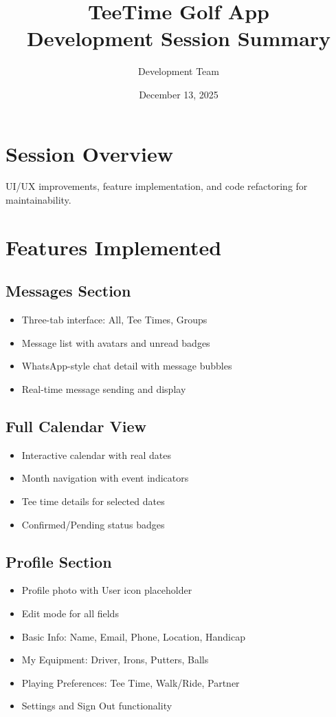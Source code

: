 \documentclass[11pt,a4paper]{article}
\title{\textbf{TeeTime Golf App}\\Development Session Summary}
\author{Development Team}
\date{December 13, 2025}
\begin{document}
\maketitle

\section{Session Overview}
UI/UX improvements, feature implementation, and code refactoring for maintainability.

\section{Features Implemented}

\subsection{Messages Section}
\begin{itemize}[noitemsep]
    \item Three-tab interface: All, Tee Times, Groups
    \item Message list with avatars and unread badges
    \item WhatsApp-style chat detail with message bubbles
    \item Real-time message sending and display
\end{itemize}

\subsection{Full Calendar View}
\begin{itemize}[noitemsep]
    \item Interactive calendar with real dates
    \item Month navigation with event indicators
    \item Tee time details for selected dates
    \item Confirmed/Pending status badges
\end{itemize}

\subsection{Profile Section}
\begin{itemize}[noitemsep]
    \item Profile photo with User icon placeholder
    \item Edit mode for all fields
    \item Basic Info: Name, Email, Phone, Location, Handicap
    \item My Equipment: Driver, Irons, Putters, Balls
    \item Playing Preferences: Tee Time, Walk/Ride, Partner
    \item Settings and Sign Out functionality
\end{itemize}
\end{document}
